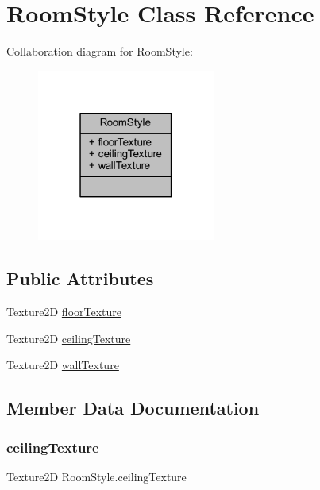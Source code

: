 \hypertarget{class_room_style}{}\section{Room\+Style Class Reference}
\label{class_room_style}


Collaboration diagram for Room\+Style\+:
\nopagebreak
\begin{figure}[H]
\begin{center}
\leavevmode
\includegraphics[width=166pt]{class_room_style__coll__graph}
\end{center}
\end{figure}
\subsection*{Public Attributes}
\begin{DoxyCompactItemize}
\item 
Texture2D \mbox{\hyperlink{class_room_style_a0115dc57b9a052d8130987bc75d9e068}{floor\+Texture}}
\item 
Texture2D \mbox{\hyperlink{class_room_style_ae81262585be24f8a263f404fb1f2f94b}{ceiling\+Texture}}
\item 
Texture2D \mbox{\hyperlink{class_room_style_afcc5e2058831aa7e50a3bd0cdcbb7b08}{wall\+Texture}}
\end{DoxyCompactItemize}


\subsection{Member Data Documentation}
\mbox{\label{class_room_style_ae81262585be24f8a263f404fb1f2f94b}} 
\subsubsection{\texorpdfstring{ceiling\+Texture}{ceilingTexture}}
{\footnotesize\ttfamily Texture2D Room\+Style.\+ceiling\+Texture}

